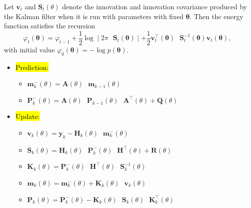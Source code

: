\begin{theorem}
    Let $\mathbf{v}_t$ and $\mathbf{S}_t(\theta)$ denote the innovation and innovation covariance produced by the Kalman filter when it is run with parameters with fixed $\boldsymbol{\theta}$. Then the energy function satisfies the recursion
    \begin{equation}
        \varphi_t(\boldsymbol{\theta}) = \varphi_{t-1} + \frac{1}{2}\log \mid 2\pi\textbf{ 
    }\mathbf{S}_t(\boldsymbol{\theta}) \mid  + \frac{1}{2}\mathbf{v}_t^\top (\boldsymbol{\theta})\textbf{ }\mathbf{S}_t^{-1}(\boldsymbol{\theta})\mathbf{v}_t(\boldsymbol{\theta}),
    \end{equation}
    with initial value $\varphi_0(\boldsymbol{\theta}) = -\log p(\boldsymbol{\theta})$.

    \begin{itemize}
        \item \hl{Prediction: }
            \begin{itemize}
                \item[] $\mathbf{m}_k^-(\theta) = \mathbf{A}(\theta)\textbf{ }\mathbf{m}_{k-1}(\theta)$
                \item[] $\mathbf{P}_k^-(\theta) = \mathbf{A}(\theta)\textbf{ }\mathbf{P}_{k-1}(\theta)\textbf{ }\mathbf{A}^\intercal(\theta)+\mathbf{Q}(\theta)$
            \end{itemize}
        \item \hl{Update: }
            \begin{itemize}
                \item[] $\mathbf{v}_k(\theta)=\mathbf{y}_k - \mathbf{H}_k(\theta)\textbf{ }\mathbf{m}_k^-(\theta)$
                \item[] $\mathbf{S}_k(\theta)= \mathbf{H}_k(\theta) \textbf{ } \mathbf{P}_k^-(\theta)\textbf{ }\mathbf{H}^\intercal(\theta)+\mathbf{R}(\theta)$
                \item[] $\mathbf{K}_k(\theta)= \mathbf{P}_k^-(\theta)\textbf{ }\mathbf{H}^\intercal(\theta)\textbf{ }\mathbf{S}_k^{-1}(\theta)$
                \item[] $\mathbf{m}_k(\theta)=\mathbf{m}_k^-(\theta)+\mathbf{K}_k(\theta)\textbf{ }\mathbf{v}_k(\theta)$
                \item[] $\mathbf{P}_k(\theta)=\mathbf{P}_k^-(\theta)- \mathbf{K}_k(\theta)\textbf{ }\mathbf{S}_k(\theta)\textbf{ }\mathbf{K}_k^\intercal(\theta)$
            \end{itemize}       
    \end{itemize} 
\end{theorem}

